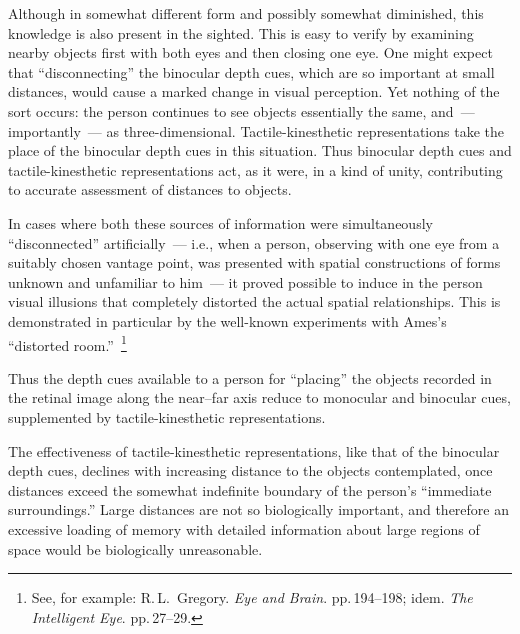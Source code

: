 Although in somewhat different form and possibly somewhat diminished, this
knowledge is also present in the sighted.  This is easy to verify by examining nearby
objects first with both eyes and then closing one eye.  One might expect that
``disconnecting'' the binocular depth cues, which are so important at small distances,
would cause a marked change in visual perception.  Yet nothing of the sort occurs: the
person continues to see objects essentially the same, and~--- importantly~--- as
three-dimensional.  Tactile-kinesthetic representations take the place of the binocular
depth cues in this situation.  Thus binocular depth cues and tactile-kinesthetic
representations act, as it were, in a kind of unity, contributing to accurate assessment
of distances to objects.


In cases where both these sources of information were simultaneously ``disconnected''
artificially~--- i.e., when a person, observing with one eye from a suitably chosen
vantage point, was presented with spatial constructions of forms unknown and
unfamiliar to him~--- it proved possible to induce in the person visual illusions that
completely distorted the actual spatial relationships.  This is demonstrated in particular
by the well-known experiments with Ames's ``distorted room.''~\footnote{%
  See, for example: R.\,L.~Gregory. \emph{Eye and Brain}. pp.\,194--198; idem.
  \emph{The Intelligent Eye}. pp.\,27--29.}

Thus the depth cues available to a person for ``placing'' the objects recorded in the
retinal image along the near--far axis reduce to monocular and binocular cues,
supplemented by tactile-kinesthetic representations.

The effectiveness of tactile-kinesthetic representations, like that of the binocular
depth cues, declines with increasing distance to the objects contemplated, once
distances exceed the somewhat indefinite boundary of the person's ``immediate
surroundings.''  Large distances are not so biologically important, and therefore an
excessive loading of memory with detailed information about large regions of space
would be biologically unreasonable.

